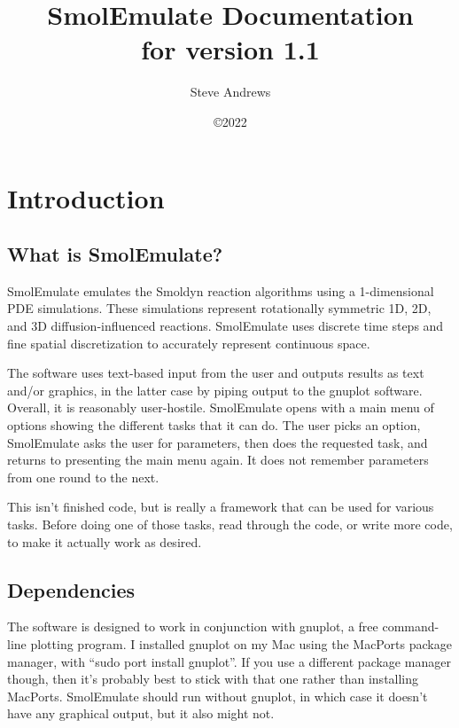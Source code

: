 \documentclass {book}
\begin{document}



\title{\textbf{SmolEmulate Documentation} \\ \large for version 1.1}
\date{\copyright 2022}
\author{Steve Andrews}
\maketitle

\tableofcontents


\chapter{Introduction}

\section{What is SmolEmulate?}

SmolEmulate emulates the Smoldyn reaction algorithms using a 1-dimensional PDE simulations. These simulations represent rotationally symmetric 1D, 2D, and 3D diffusion-influenced reactions. SmolEmulate uses discrete time steps and fine spatial discretization to accurately represent continuous space.

The software uses text-based input from the user and outputs results as text and/or graphics, in the latter case by piping output to the gnuplot software. Overall, it is reasonably user-hostile. SmolEmulate opens with a main menu of options showing the different tasks that it can do. The user picks an option, SmolEmulate asks the user for parameters, then does the requested task, and returns to presenting the main menu again. It does not remember parameters from one round to the next.

This isn't finished code, but is really a framework that can be used for various tasks. Before doing one of those tasks, read through the code, or write more code, to make it actually work as desired.

\section{Dependencies}

The software is designed to work in conjunction with gnuplot, a free command-line plotting program. I installed gnuplot on my Mac using the MacPorts package manager, with ``sudo port install gnuplot''. If you use a different package manager though, then it's probably best to stick with that one rather than installing MacPorts. SmolEmulate should run without gnuplot, in which case it doesn't have any graphical output, but it also might not.
\end{document}
